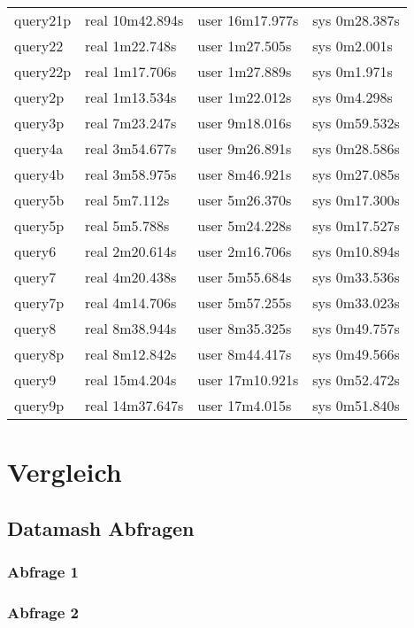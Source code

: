 \begin{tabular}{p{}|p{}|p{}|p{}}
query21p & real 10m42.894s & user 16m17.977s & sys 0m28.387s\\
query22 & real 1m22.748s & user 1m27.505s & sys 0m2.001s\\
query22p & real 1m17.706s & user 1m27.889s & sys 0m1.971s\\
query2p & real 1m13.534s & user 1m22.012s & sys 0m4.298s\\
query3p & real 7m23.247s & user 9m18.016s & sys 0m59.532s\\
query4a & real 3m54.677s & user 9m26.891s & sys 0m28.586s\\
query4b & real 3m58.975s & user 8m46.921s & sys 0m27.085s\\
query5b & real 5m7.112s & user 5m26.370s & sys 0m17.300s\\
query5p & real 5m5.788s & user 5m24.228s & sys 0m17.527s\\
query6 & real 2m20.614s & user 2m16.706s & sys 0m10.894s\\
query7 & real 4m20.438s & user 5m55.684s & sys 0m33.536s\\
query7p & real 4m14.706s & user 5m57.255s & sys 0m33.023s\\
query8 & real 8m38.944s & user 8m35.325s & sys 0m49.757s\\
query8p & real 8m12.842s & user 8m44.417s & sys 0m49.566s\\
query9 & real 15m4.204s & user 17m10.921s & sys 0m52.472s\\
query9p & real 14m37.647s & user 17m4.015s & sys 0m51.840s\\
\end{tabular}

\chapter{Vergleich}
\section{Datamash Abfragen}
\subsection{Abfrage 1}

\subsection{Abfrage 2}

